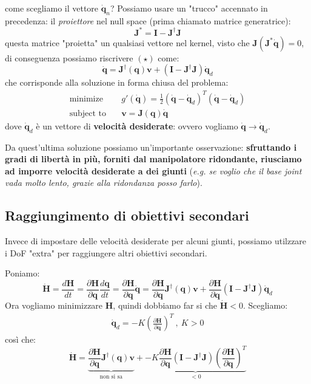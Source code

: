 come scegliamo il vettore $\bm{\dot{q}}_n$? Possiamo usare un "trucco" accennato in precedenza: il \textit{proiettore} nel null space (prima chiamato matrice generatrice):
$$
\bm{J}^* = \bm{I} - \bm{J}^\dagger\bm{J}
$$
questa matrice "proietta" un qualsiasi vettore nel kernel, visto che $\bm{J}(\bm{J}^* \bm{\dot{q}}) = 0$, di conseguenza possiamo riscrivere $(\star)$ come:
\begin{equation}\label{eq:diff_inv_kine_redundant}
\boxed{
\dot{\bm{q}} = \bm{J}^{\dagger}(\bm{q})\bm{v}
+
(\bm{I} - \bm{J}^\dagger\bm{J})\dot{\bm{q}}_d
}
\end{equation}
che corrisponde alla soluzione in forma chiusa del problema:
\begin{align*}
	\text{minimize} & \quad 
	g'(\dot{\bm{q}}) = \frac{1}{2} ( \dot{\bm{q}} - \dot{\bm{q}}_d )^T ( \dot{\bm{q}} - \dot{\bm{q}}_d ) \\
	\text{subject to} & \quad \bm{v} = \bm{J}(\bm{q})\bm{\dot{q}}
\end{align*}
dove $\bm{\dot{q}}_d$ è un vettore di \textbf{velocità desiderate}: ovvero vogliamo $\bm{\dot{q}} \to \bm{\dot{q}}_d$. 

Da quest'ultima soluzione possiamo un'importante osservazione: \textbf{sfruttando i gradi di libertà in più, forniti dal manipolatore ridondante, riusciamo ad imporre velocità desiderate a dei giunti} (\textit{e.g. se voglio che il base joint vada molto lento, grazie alla ridondanza posso farlo}).




\subsection{Raggiungimento di obiettivi secondari}
Invece di impostare delle velocità desiderate per alcuni giunti, possiamo utilzzare i DoF "extra" per raggiungere altri obiettivi secondari.

Poniamo:
$$
\dot{\bm{H}}
=
\frac{d\bm{H}}{dt}
=
\frac{\partial\bm{H}}{\partial \bm{q}} \frac{d\bm{q}}{dt}
=
\frac{\partial\bm{H}}{\partial \bm{q}} \bm{\dot{q}}
=
\frac{\partial\bm{H}}{\partial \bm{q}} \bm{J}^{\dagger}(\bm{q})\bm{v}
+
\frac{\partial\bm{H}}{\partial \bm{q}}(\bm{I} - \bm{J}^\dagger\bm{J})\dot{\bm{q}}_d
$$
Ora vogliamo minimizzare $\bm{H}$, quindi dobbiamo far si che $\bm{\dot{H}} < 0$. Scegliamo:
\begin{gather*}
	\dot{\bm{q}}_d = -K(\frac{\partial\bm{H}}{\partial \bm{q}})^T \ , \ K > 0
\end{gather*}
così che:
$$
\dot{\bm{H}}
=
\underbrace{
\frac{\partial\bm{H}}{\partial \bm{q}} \bm{J}^{\dagger}(\bm{q})\bm{v}
}_{\text{non si sa}}
+
\underbrace{
-K\frac{\partial\bm{H}}{\partial \bm{q}}(\bm{I} - \bm{J}^\dagger\bm{J})(\frac{\partial\bm{H}}{\partial \bm{q}})^T
}_{<0}
$$


